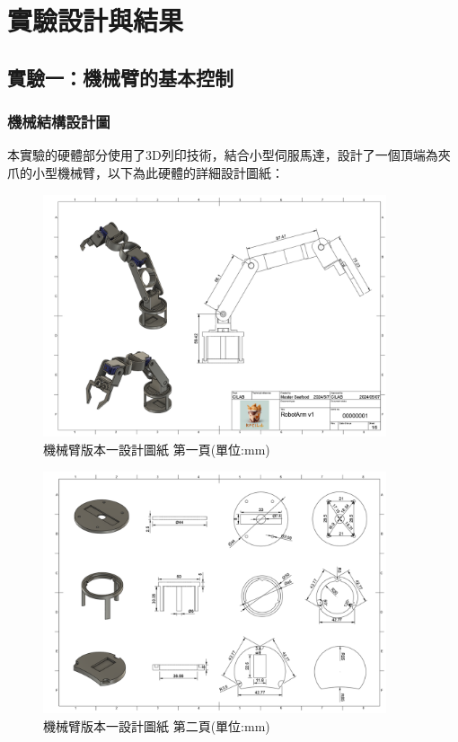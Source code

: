\documentclass[class=NCU_thesis, crop=false]{standalone}
\begin{document}
\chapter{實驗設計與結果}

\section{實驗一：機械臂的基本控制}
\subsection{機械結構設計圖}
本實驗的硬體部分使用了3D列印技術，結合小型伺服馬達，設計了一個頂端為夾爪的小型機械臂，以下為此硬體的詳細設計圖紙：
\begin{figure}[htbp]
    \centering
    \includegraphics[width=0.9\textwidth]{figures/Armv1 (1).PNG}
    \caption{機械臂版本一設計圖紙 第一頁(單位:mm)}
\end{figure}

\begin{figure}[htbp]
    \centering
    \includegraphics[width=0.9\textwidth]{figures/Armv1 (2).PNG}
    \caption{機械臂版本一設計圖紙 第二頁(單位:mm)}
\end{figure}
\end{document}
